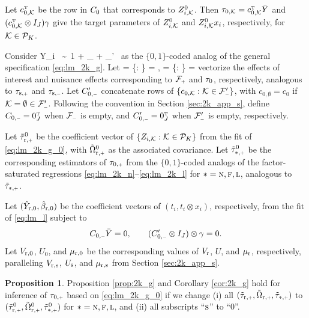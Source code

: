 \documentclass[11pt]{article}
\theoremstyle{definition}
\newtheorem{proposition}{Proposition}
\begin{document}
Let $c_{0, \mathcal{K}}^{ \mathrm{\scriptscriptstyle T} }$ be the row in $C_0$ that corresponds to $Z_{i, \mathcal{K}}^0$. 
Then $\tau_{0, \mathcal{K}}  = c_{0, \mathcal{K}}^{ \mathrm{\scriptscriptstyle T} }  \bar Y$ and $   (c_{0, \mathcal{K}}^{ \mathrm{\scriptscriptstyle T} }  \otimes I_J) \gamma $ give the target parameters of $Z_{i, \mathcal{K}}^0$ and $Z_{i, \mathcal{K}}^0 x_i$, respectively, for $\mathcal{K}\in\mathcal P_K$. 

Consider 
\beginy\label{eq:lm_2k_g_0}
Y_i \ \sim \ 1 + \sum_{\mk \in \mfp} \zimkz + \sum_{\mk \in \mfp'} \zimkz \, \cxi 
\endy 
as the $\{0,1\}$-coded analog of the general specification \eqref{eq:lm_2k_g}. 
Let 
\begina
\tzp   = \{\tzmk   : \mk \in \mfp \} = \czp\by, \qquad 
\tzm = \{\tzmk : \mk\in\mfm \} = \czm \by
\enda
 vectorize the effects of interest and nuisance effects corresponding to $\mfp$ and $\tau_0$, respectively, analogous to $\tsp$ and $\tsm$. 
Let $\czm'$ concatenate rows of $\{\czmk:\mk\in \mfm'\}$, with $c_{0,\emptyset} = c_0$ if $\mk = \emptyset \in \mfm'$.
Following the convention in Section \ref{sec:2k_app_s}, define $\czm = 0_J^\T$ when $\mfm$ is empty, and $\czm' = 0_J^\T$ when $\mfm'$ is empty, respectively.

Let $\ttrp^0$ be the coefficient vector of $\{Z_{i, \mathcal{K}}:\mathcal{K}\in\mathcal P_K\}$ from the \olss fit of  \eqref{eq:lm_2k_g_0}, with $\torp^0$ as the associated \ehws covariance.  
Let $\ttsp^0$ be the corresponding estimators of $\tzp$ from the $\{0,1\}$-coded analogs of the factor-saturated regressions \eqref{eq:lm_2k_n}--\eqref{eq:lm_2k_l} for $* =\textsc{n}, \textsc{f}, \textsc{l}$, analogous to $\ttsp$. 

Let $(\hat Y_{\textup{r},0}, \hat\beta_{\textup{r},0})$ be the coefficient vectors of $(t_i, t_i \otimes x_i)$, respectively, from the \rolss fit of  \eqref{eq:lm_l} subject to 
$$
\czm \by = 0, \qquad (\czm' \otimes I_J) \otimes \gamma = 0.
$$ 
Let $V_{\textup{r},0}$, $U_0$, and $\mu_{\textup{r},0}$ be the corresponding values of $V_{\textup{r}}$, $U$, and $\mu_{{\textup{r}} }$, respectively, paralleling $V_{\textup{r},{\textsc{s}}}$, $U_{\textsc{s}}$, and $\mu_{\textup{r},{\textsc{s}}}$ from Section \ref{sec:2k_app_s}. 


\begin{proposition}\label{prop:2k_0}
Proposition \ref{prop:2k_g} and Corollary \ref{cor:2k_g} hold for inference of $\tzp$ based on \eqref{eq:lm_2k_g_0} if we change (i) all $(\ttrp, \torp, \ttsp)$ to $(\ttrp^0, \torp^0, \ttsp^0)$ for $* =\textsc{n}, \textsc{f}, \textsc{l}$, and (ii) all subscripts ``${\textsc{s}}$'' to ``$0$''. 
\end{proposition}
\end{document}
